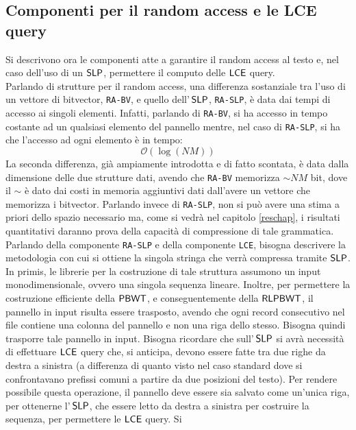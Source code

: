 \subsection{Componenti per il random access e le LCE query}
Si descrivono ora le componenti atte a garantire il
random access
al testo e, nel caso dell'uso di un $\mbox{\rm {\sf SLP}}$, permettere il computo delle
$\mbox{\rm {\sf LCE}}$ query.\\
Parlando di strutture per il random access, una differenza sostanziale tra
l'uso di un vettore di bitvector, \texttt{RA-BV}, e quello
dell'$\,\mbox{\rm {\sf SLP}}$, \texttt{RA-SLP}, è data dai tempi di accesso ai singoli
elementi. Infatti, parlando di \texttt{RA-BV}, si ha accesso in tempo costante
ad un qualsiasi elemento del pannello mentre, nel caso di \texttt{RA-SLP}, si ha
che l'accesso ad ogni elemento è in tempo:
\begin{equation}
  \label{eq:timera}
  \mathcal{O}(\log (NM))
\end{equation}
La seconda differenza, già ampiamente introdotta e di fatto scontata, è data
dalla dimensione delle due strutture dati, avendo che \texttt{RA-BV} memorizza
$\sim NM$ bit, dove il $\sim$ è dato dai costi in memoria aggiuntivi dati
dall'avere un vettore che memorizza i bitvector. Parlando invece di
\texttt{RA-SLP}, non si può avere una stima a priori dello spazio necessario ma,
come si vedrà nel capitolo \ref{reschap}, i risultati quantitativi daranno prova
della capacità di compressione di tale grammatica.\\
Parlando della componente \texttt{RA-SLP} e della componente
\texttt{LCE}, bisogna descrivere la metodologia con cui 
si ottiene la singola stringa che verrà compressa tramite $\mbox{\rm {\sf SLP}}$.
In primis, le
librerie per la costruzione di tale struttura assumono un input
monodimensionale, ovvero una singola sequenza lineare. Inoltre, per
permettere la costruzione efficiente della $\mbox{\rm {\sf PBWT}}$, e conseguentemente
della $\mbox{\rm {\sf RLPBWT}}$, il pannello in input risulta essere trasposto, avendo che
ogni record consecutivo nel file contiene una colonna del pannello e non una
riga dello stesso. Bisogna
quindi trasporre tale pannello in input. Bisogna ricordare che sull'$\,\mbox{\rm {\sf SLP}}$
si avrà  
necessità di effettuare $\mbox{\rm {\sf LCE}}$ query che, si anticipa, devono essere fatte tra
due righe da destra a sinistra (a differenza 
di quanto visto nel caso standard dove si confrontavano prefissi comuni a
partire da due posizioni del testo). Per
rendere possibile questa operazione, il pannello deve essere sia 
salvato come un'unica riga, per ottenerne l'$\,\mbox{\rm {\sf SLP}}$, che essere letto da destra
a sinistra per costruire la sequenza, per permettere le $\mbox{\rm {\sf LCE}}$ query. Si
